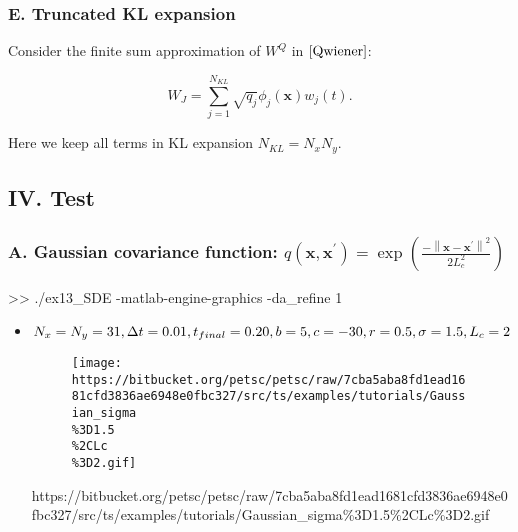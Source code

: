 \documentclass[
]{article}
\newenvironment{Shaded}{}{}
\newcommand{\FloatTok}[1]{\textcolor[rgb]{0.25,0.63,0.44}{#1}}
\newcommand{\NormalTok}[1]{#1}
\begin{document}
\hypertarget{header-n225}{%
\subsubsection{E. Truncated KL expansion}\label{header-n225}}

Consider the finite sum approximation of \(W^Q\) in \(\eqref{Qwiener}\):

\[W_J=\sum^{N_{KL}}_{j=1}\sqrt{q_j}\phi_j(\mathbf{x})w_{j}(t).\]

Here we keep all terms in KL expansion \(N_{KL}=N_xN_y\).

\hypertarget{header-n131}{%
\subsection{IV. Test}\label{header-n131}}

\hypertarget{header-n316}{%
\subsubsection{\texorpdfstring{A. Gaussian covariance function:
\(q(\mathbf{x},\mathbf{x}^{\prime})=\exp \left(\frac{-\left\|\mathbf{x}-\mathbf{x}^{\prime}\right\|^{2}}{2 L_{c}^{2}}\right)\)}{A. Gaussian covariance function: q(\textbackslash mathbf\{x\},\textbackslash mathbf\{x\}\^{}\{\textbackslash prime\})=\textbackslash exp \textbackslash left(\textbackslash frac\{-\textbackslash left\textbackslash\textbar\textbackslash mathbf\{x\}-\textbackslash mathbf\{x\}\^{}\{\textbackslash prime\}\textbackslash right\textbackslash\textbar\^{}\{2\}\}\{2 L\_\{c\}\^{}\{2\}\}\textbackslash right)}}\label{header-n316}}

\begin{Shaded}
\begin{Highlighting}[]
\NormalTok{>> ./ex13_SDE -matlab-engine-graphics -da_refine }\FloatTok{1}
\end{Highlighting}
\end{Shaded}

\begin{itemize}
\item
  \(N_x=N_y=31, \Delta t=0.01, t_{final}=0.20,\\b=5,c=-30,r=0.5,\\\sigma=1.5,L_{c}=2\)

  \begin{figure}
  \centering
  \texttt{[image: https://bitbucket.org/petsc/petsc/raw/7cba5aba8fd1ead1681cfd3836ae6948e0fbc327/src/ts/examples/tutorials/Gaussian\_sigma\\\%3D1.5\\\%2CLc\\\%3D2.gif]}
  \caption{}
  \end{figure}

  https://bitbucket.org/petsc/petsc/raw/7cba5aba8fd1ead1681cfd3836ae6948e0fbc327/src/ts/examples/tutorials/Gaussian\_sigma\%3D1.5\%2CLc\%3D2.gif
\end{itemize}
\end{document}

